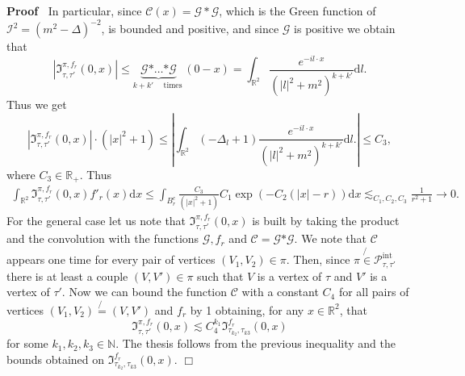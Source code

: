 \documentclass[a4paper,10pt]{article}
\newcommand{\asterisk}{\mathord{*}}
\newcommand{\mathd}{\mathrm{d}}
\newcommand{\tmop}[1]{\ensuremath{\operatorname{#1}}}
\newenvironment{proof}{\noindent\textbf{Proof\ }}{\hspace*{\fill}$\Box$\medskip}
\begin{document}
\begin{proof}
  In particular, since $\mathcal{C} (x) = \mathcal{G} \ast \mathcal{G}$, which
  is the Green function of $\mathcal{I}^2 = (m^2 - \Delta)^{- 2}$, is bounded
  and positive, and since $\mathcal{G}$ is positive we obtain that
  \[ | \mathfrak{I}^{\pi, f_r}_{\tau, \tau'} (0, x) | \leqslant
     \underbrace{\mathcal{G} \asterisk \ldots \asterisk \mathcal{G}}_{k + k'
     \quad \tmop{times}} (0 - x) = \int_{\mathbb{R}^2} \frac{e^{- i l \cdot
     x}}{(| l |^2 + m^2)^{k + k'}} \mathd l. \]
  Thus we get
  \[ | \mathfrak{I}^{\pi, f_r}_{\tau, \tau'} (0, x) | \cdot (| x |^2 + 1)
     \leqslant \left| \int_{\mathbb{R}^2} (- \Delta_l + 1) \frac{e^{- i l
     \cdot x}}{(| l |^2 + m^2)^{k + k'}} \mathd l. \right| \leqslant C_3, \]
  where $C_3 \in \mathbb{R}_+$. Thus
  \begin{multline*}
    \int_{\mathbb{R}^2} \mathfrak{I}^{\pi, f_r}_{\tau, \tau'} (0, x) f'_r (x)
    \mathd x   \leqslant \int_{B_r^c} \frac{C_3}{(| x |^2 + 1)} C_1 \exp (- C_2 (| x | -
    r)) \mathd x \lesssim_{C_1, C_2, C_3} \frac{1}{r^2 + 1} \rightarrow 0.
  \end{multline*}
  For the general case let us note that $\mathfrak{I}^{\pi, f_r}_{\tau, \tau'}
  (0, x)$ is built by taking the product and the convolution with the
  functions $\mathcal{G}, f_r$ and $\mathcal{C} = \mathcal{G} \asterisk
  \mathcal{G}$. We note that $\mathcal{C}$ appears one time for every pair of
  vertices $(V_1, V_2) \in \pi$. Then, since $\pi \not{\in}
  \mathcal{P}^{\tmop{int}}_{\tau, \tau'}$ there is at least a couple $(V, V')
  \in \pi$ such that $V$ is a vertex of $\tau$ and $V'$ is a vertex of
  $\tau'$. Now we can bound the function $\mathcal{C}$ with a constant $C_4$
  for all pairs of vertices $(V_1, V_2) \not{=} (V, V')$ and $f_r$ by 1
  obtaining, for any $x \in \mathbb{R}^2$, that
  \[ \mathfrak{I}^{\pi, f_r}_{\tau, \tau'} (0, x) \lesssim C_4^{k_1}
     \mathfrak{I}^{f_r}_{\tau_{k_2}, \tau_{k 3}} (0, x) \]
  for some $k_1, k_2, k_3 \in \mathbb{N}$. The thesis follows from the
  previous inequality and the bounds obtained on
  $\mathfrak{I}^{f_r}_{\tau_{k_2}, \tau_{k 3}} (0, x) .$
\end{proof}
\end{document}

